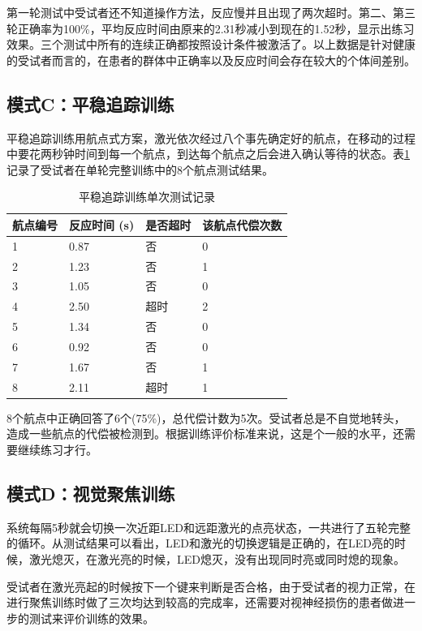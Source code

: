 第一轮测试中受试者还不知道操作方法，反应慢并且出现了两次超时。第二、第三轮正确率为100\%，平均反应时间由原来的2.31秒减小到现在的1.52秒，显示出练习效果。三个测试中所有的连续正确都按照设计条件被激活了。以上数据是针对健康的受试者而言的，在患者的群体中正确率以及反应时间会存在较大的个体间差别。

\subsection{模式C：平稳追踪训练}

平稳追踪训练用航点式方案，激光依次经过八个事先确定好的航点，在移动的过程中要花两秒钟时间到每一个航点，到达每个航点之后会进入确认等待的状态。表\ref{tab:pursuit_test}记录了受试者在单轮完整训练中的8个航点测试结果。

\begin{table}[h!]
\centering
\caption{平稳追踪训练单次测试记录}
\label{tab:pursuit_test}
\begin{tabular}{p{2cm} p{2.5cm} p{2.5cm} p{3.5cm}}
\toprule[1.5pt]
\textbf{航点编号} & \textbf{反应时间 (s)} & \textbf{是否超时} & \textbf{该航点代偿次数} \\
\midrule[1pt]
1  & 0.87  & 否 & 0 \\
2  & 1.23  & 否 & 1 \\
3  & 1.05  & 否 & 0 \\
4  & 2.50  & 超时 & 2 \\
5  & 1.34  & 否 & 0 \\
6  & 0.92  & 否 & 0 \\
7  & 1.67  & 否 & 1 \\
8  & 2.11  & 超时 & 1 \\
\bottomrule[1.5pt]
\end{tabular}
\end{table}

8个航点中正确回答了6个(75\%)，总代偿计数为5次。受试者总是不自觉地转头，造成一些航点的代偿被检测到。根据训练评价标准来说，这是个一般的水平，还需要继续练习才行。

\subsection{模式D：视觉聚焦训练}

系统每隔5秒就会切换一次近距LED和远距激光的点亮状态，一共进行了五轮完整的循环。从测试结果可以看出，LED和激光的切换逻辑是正确的，在LED亮的时候，激光熄灭，在激光亮的时候，LED熄灭，没有出现同时亮或同时熄的现象。

受试者在激光亮起的时候按下一个键来判断是否合格，由于受试者的视力正常，在进行聚焦训练时做了三次均达到较高的完成率，还需要对视神经损伤的患者做进一步的测试来评价训练的效果。

